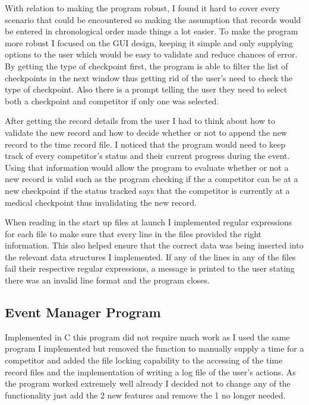 \documentclass[a4paper,12pt]{article}
\begin{document}
\vspace{5mm}
\noindent With relation to making the program robust, I found it hard to cover every scenario that could be encountered so making the assumption that records would be entered in chronological order made things a lot easier. To make the program more robust I focused on the GUI design, keeping it simple and only supplying options to the user which would be easy to validate and reduce chances of error. By getting the type of checkpoint first, the program is able to filter the list of checkpoints in the next window thus getting rid of the user's need to check the type of checkpoint. Also there is a prompt telling the user they need to select both a checkpoint and competitor if only one was selected.

\vspace{5mm}
\noindent After getting the record details from the user I had to think about how to validate the new record and how to decide whether or not to append the new record to the time record file. I noticed that the program would need to keep track of every competitor's status and their current progress during the event. Using that information would allow the program to evaluate whether or not a new record is valid such as the program checking if the a competitor can be at a new checkpoint if the status tracked says that the competitor is currently at a medical checkpoint thus invalidating the new record.

\vspace{5mm} When reading in the start up files at launch I implemented regular expressions for each file to make sure that every line in the files provided the right information. This also helped ensure that the correct data was being inserted into the relevant data structures I implemented. If any of the lines in any of the files fail their respective regular expressions, a message is printed to the user stating there was an invalid line format and the program closes.

\subsection{Event Manager Program}
\noindent Implemented in C this program did not require much work as I used the same program I implemented but removed the function to manually supply a time for a competitor and added the file locking capability to the accessing of the time record files and the implementation of writing a log file of the user's actions. As the program worked extremely well already I decided not to change any of the functionality just add the 2 new features and remove the 1 no longer needed.
\end{document}
